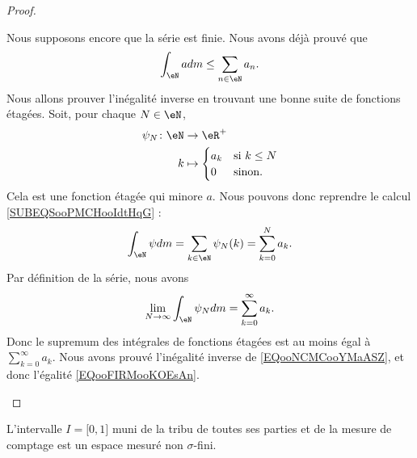 \begin{proof}
\begin{subproof}
        Nous supposons encore que la série est finie. Nous avons déjà prouvé que
        \begin{equation}            \label{EQooNCMCooYMaASZ}
            \int_{\eN}adm\leq \sum_{n\in \eN}a_n.
        \end{equation}
        Nous allons prouver l'inégalité inverse en trouvant une bonne suite de fonctions étagées. Soit, pour chaque \( N\in \eN\),
        \begin{equation}
            \begin{aligned}
                \psi_N\colon \eN&\to \eR^+ \\
                k&\mapsto \begin{cases}
                    a_k    &   \text{si } k\leq N\\
                    0    &    \text{sinon. }
                \end{cases}
            \end{aligned}
        \end{equation}
        Cela est une fonction étagée qui minore \( a\). Nous pouvons donc reprendre le calcul \eqref{SUBEQSooPMCHooIdtHqG} :
        \begin{equation}
            \int_{\eN}\psi dm=\sum_{k\in \eN}\psi_N(k)=\sum_{k=0}^Na_k.
        \end{equation}
        Par définition de la série, nous avons
        \begin{equation}
            \lim_{N\to \infty} \int_{\eN}\psi_N dm=\sum_{k=0}^{\infty}a_k.
        \end{equation}
        Donc le supremum des intégrales de fonctions étagées est au moins égal à \( \sum_{k=0}^{\infty}a_k\). Nous avons prouvé l'inégalité inverse de \eqref{EQooNCMCooYMaASZ}, et donc l'égalité \eqref{EQooFIRMooKOEsAn}.
    \end{subproof}
\end{proof}

\begin{example}     \label{EXooDMAUooWWVZbq}
	L'intervalle \( I=\mathopen[ 0 , 1 \mathclose]\) muni de la tribu de toutes ses parties et de la mesure de comptage est un espace mesuré non \( \sigma\)-fini.
\end{example}

